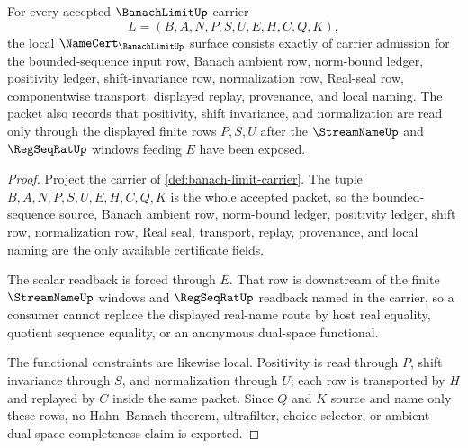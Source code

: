 \begin{theorem}
\label{thm:banach-limit-namecert-obligations}
For every accepted $\BanachLimitUp$ carrier
$$
L=(B,A,N,P,S,U,E,H,C,Q,K),
$$
the local $\NameCert_{\BanachLimitUp}$ surface consists exactly of carrier admission for the bounded-sequence input row, Banach ambient row, norm-bound ledger, positivity ledger, shift-invariance row, normalization row, Real-seal row, componentwise transport, displayed replay, provenance, and local naming. The packet also records that positivity, shift invariance, and normalization are read only through the displayed finite rows $P,S,U$ after the $\StreamNameUp$ and $\RegSeqRatUp$ windows feeding $E$ have been exposed.
\end{theorem}
\begin{proof}
Project the carrier of \autoref{def:banach-limit-carrier}. The tuple $B,A,N,P,S,U,E,H,C,Q,K$ is the whole accepted packet, so the bounded-sequence source, Banach ambient row, norm-bound ledger, positivity ledger, shift row, normalization row, Real seal, transport, replay, provenance, and local naming are the only available certificate fields.

The scalar readback is forced through $E$. That row is downstream of the finite $\StreamNameUp$ windows and $\RegSeqRatUp$ readback named in the carrier, so a consumer cannot replace the displayed real-name route by host real equality, quotient sequence equality, or an anonymous dual-space functional.

The functional constraints are likewise local. Positivity is read through $P$, shift invariance through $S$, and normalization through $U$; each row is transported by $H$ and replayed by $C$ inside the same packet. Since $Q$ and $K$ source and name only these rows, no Hahn--Banach theorem, ultrafilter, choice selector, or ambient dual-space completeness claim is exported.
\end{proof}

